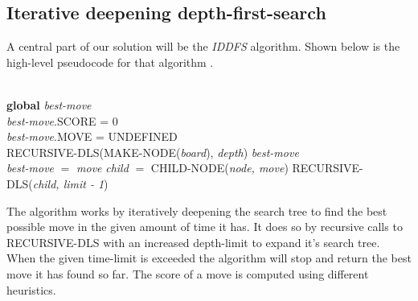 \documentclass[a4paper,11pt]{article}
\begin{document}
\subsection{Iterative deepening depth-first-search}
A central part of our solution will be the \emph{IDDFS} algorithm.
Shown below is the
high-level pseudocode for that algorithm \cite{aimodern}.\\
\begin{algorithmic}
 \\
\textbf{global} \emph{best-move} \\
\emph{best-move}.SCORE = 0 \\
\emph{best-move}.MOVE = UNDEFINED \\
\State RECURSIVE-DLS(MAKE-NODE(\emph{board}), \emph{depth})
\State \Return \emph{best-move}
\EndIf
\EndFor
\EndFunction
\\
\State \emph{best-move} $=$ \emph{move}
\EndIf
\State \emph{child} $=$ CHILD-NODE(\emph{node, move})
\State RECURSIVE-DLS(\emph{child, limit - 1})
\EndFor
\EndIf
\EndFunction
\end{algorithmic}

The algorithm works by iteratively deepening the search tree to find the best possible move in the given
amount of time it has. It does so by recursive calls to RECURSIVE-DLS with an increased depth-limit to expand
it's search tree. When the given time-limit is exceeded the algorithm will stop and return the best move it has
found so far. The score of a move is computed using different heuristics.





\end{document}
